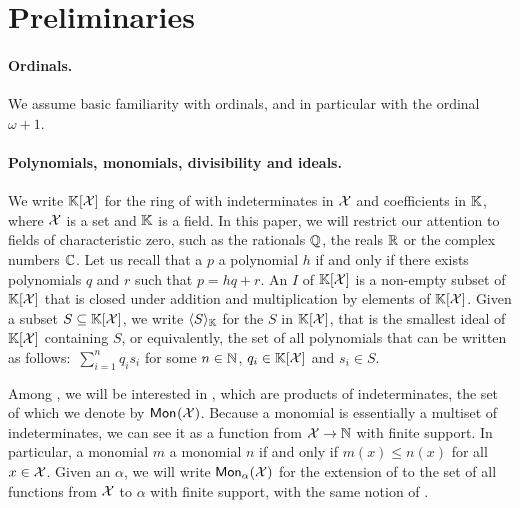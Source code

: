 \section{Preliminaries}
\label{sec:preliminaries}

\paragraph{Ordinals.} We assume basic familiarity with ordinals, and in
particular with the ordinal $\omega+1$.  

\paragraph{Polynomials, monomials, divisibility and
ideals.} We write $\poly{\K}{\X}$ for the ring of
 with indeterminates in $\X$ and
coefficients in $\K$, where $\X$ is a set and $\K$ is a
field. In this paper, we will restrict our attention to
fields of characteristic zero, such as the rationals
$\Q$, the reals $\R$ or the complex numbers $\C$. Let us
recall that a  $p$  a
polynomial $h$ if and only if there exists polynomials
$q$ and $r$ such that $p = h q + r$. An  $I$
of $\poly{\K}{\X}$ is a non-empty subset of
$\poly{\K}{\X}$ that is closed under addition and
multiplication by elements of $\poly{\K}{\X}$. Given a
subset $S \subseteq \poly{\K}{\X}$, we write
$\gen{S}{\K}$ for the  $S$ in
$\poly{\K}{\X}$, that is the smallest ideal of
$\poly{\K}{\X}$ containing $S$, or equivalently, the set
of all polynomials that can be written as follows:
$\,\sum_{i=1}^n q_i s_i$ for some $n \in \N$, $q_i \in
\poly{\K}{\X}$ and $s_i \in S$.

Among , we will be interested in , which are
products of indeterminates, the set of which we denote by $\mon{\X}$. Because a
monomial is essentially a multiset of indeterminates, we can see it as a
function from $\X \to \N$ with finite support. In particular, a monomial $m$
 a monomial $n$ if and only if $m(x) \leq n(x)$ for all $x \in \X$.
Given an  $\alpha$, we will write $\mon[\alpha]{\X}$ for the
extension of  to the set of all functions from $\X$ to $\alpha$
with finite support, with the same notion of .


